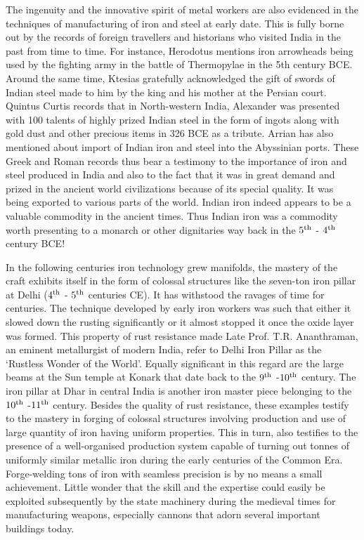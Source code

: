The ingenuity and the innovative spirit of metal workers are also evidenced in the techniques of manufacturing of iron and steel at early date. This is fully borne out by the records of foreign travellers and historians who visited India in the past from time to time. For instance, Herodotus mentions iron arrowheads being used by the fighting army in the battle of Thermopylae in the 5th century BCE. Around the same time, Ktesias gratefully acknowledged the gift of swords of Indian steel made to him by the king and his mother at the Persian court. Quintus Curtis records that in North-western India, Alexander was presented with 100 talents of highly prized Indian steel in the form of ingots along with gold dust and other precious items in 326 BCE as a tribute. Arrian has also mentioned about import of Indian iron and steel into the Abyssinian ports. These Greek and Roman records thus bear a testimony to the importance of iron and steel produced in India and also to the fact that it was in great demand and prized in the ancient world civilizations because of its special quality. It was being exported to various parts of the world. Indian iron indeed appears to be a valuable commodity in the ancient times. Thus Indian iron was a commodity worth presenting to a monarch or other dignitaries way back in the $5^{\rm th}$ - $4^{\rm th}$ century BCE! 

In the following centuries iron technology grew manifolds, the mastery of the craft exhibits itself in the form of colossal structures like the seven-ton iron pillar at Delhi ($4^{\rm th}$ - $5^{\rm th}$ centuries CE). It has withstood the ravages of time for centuries. The technique developed by early iron workers was such that either it slowed down the rusting significantly or it almost stopped it once the oxide layer was formed. This property of rust resistance made Late Prof. T.R. Ananthraman, an eminent metallurgist of modern India, refer to Delhi Iron Pillar as the ‘Rustless Wonder of the World’. Equally significant in this regard are the large beams at the Sun temple at Konark that date back to the $9^{\rm th}$ -$10^{\rm th}$ century. The iron pillar at Dhar in central India is another iron master piece belonging to the $10^{\rm th}$ -$11^{\rm th}$ century. Besides the quality of rust resistance, these examples testify to the mastery in forging of colossal structures involving production and use of large quantity of iron having uniform properties. This in turn, also testifies to the presence of a well-organised production system capable of turning out tonnes of uniformly similar metallic iron during the early centuries of the Common Era. Forge-welding tons of iron with seamless precision is by no means a small achievement.  Little wonder that the skill and the expertise could easily be exploited subsequently by the state machinery during the medieval times for manufacturing weapons, especially cannons that adorn several important buildings today.

